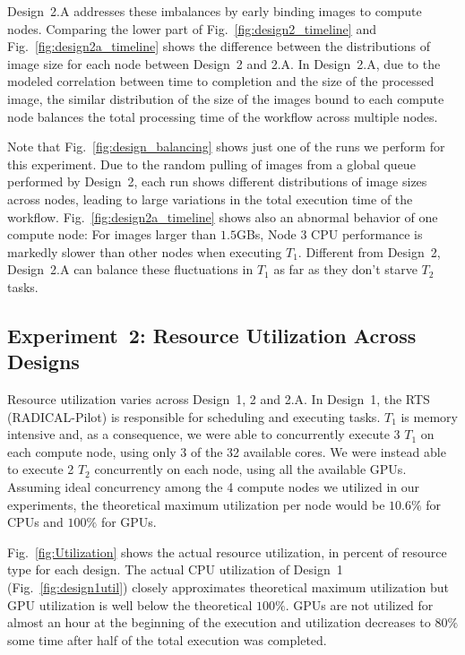 Design~2.A addresses these imbalances by early binding images to compute nodes.
Comparing the lower part of Fig.~\ref{fig:design2_timeline} and Fig.~\ref{fig:design2a_timeline} shows the difference between the distributions of image size for each node between Design~2 and 2.A.
In Design~2.A, due to the modeled correlation between time to completion and the size of the processed image, the similar distribution of the size of the images bound to each compute node balances the total processing time of the workflow across multiple nodes.

Note that Fig.~\ref{fig:design_balancing} shows just one of the runs we perform for this experiment.
Due to the random pulling of images from a global queue performed by Design~2, each run shows different distributions of image sizes across nodes, leading to large variations in the total execution time of the workflow.
Fig.~\ref{fig:design2a_timeline} shows also an abnormal behavior of one compute node: For images larger than $1.5$GBs, Node 3 CPU performance is markedly slower than other nodes when executing $T_{1}$.
Different from Design~2, Design~2.A can balance these fluctuations in $T_{1}$ as far as they don't starve $T_{2}$ tasks.

\subsection{Experiment~2: Resource Utilization Across Designs}\label{ssec:exp2}

Resource utilization varies across Design~1, 2 and 2.A. In Design~1, the RTS (RADICAL-Pilot) is responsible for scheduling and executing tasks.
$T_{1}$ is memory intensive and, as a consequence, we were able to concurrently execute 3 $T_{1}$ on each compute node, using only 3 of the 32 available cores.
We were instead able to execute 2 $T_{2}$ concurrently on each node, using all the available GPUs.
Assuming ideal concurrency among the 4 compute nodes we utilized in our experiments, the theoretical maximum utilization per node would be $10.6\%$ for CPUs and $100\%$ for GPUs.

Fig.~\ref{fig:Utilization} shows the actual resource utilization, in percent of resource type for each design.
The actual CPU utilization of Design~1 (Fig.~\ref{fig:design1util}) closely approximates theoretical maximum utilization but GPU utilization is well below the theoretical $100\%$.
GPUs are not utilized for almost an hour at the beginning of the execution and utilization decreases to $80\%$ some time after half of the total execution was completed.

